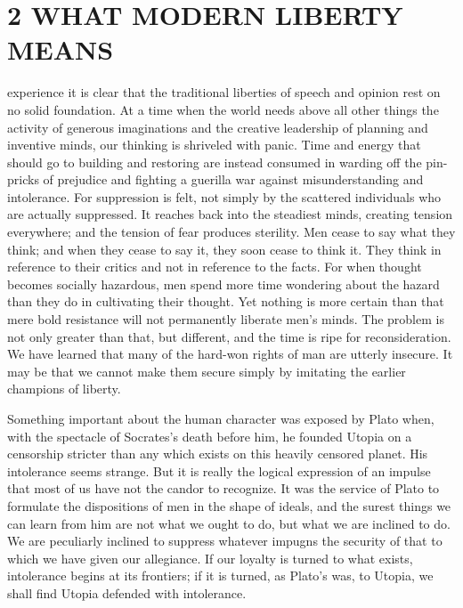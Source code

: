 \documentclass[openany,nobib,twoside,nohyper]{tufte-book}
\let\oldchapter\chapter
\def\chapter{%
  \setcounter{footnote}{0}%
  \oldchapter
}
\begin{document}
\newpage
\thispagestyle{plain} %
\mbox{}

\chapter[2 \hspace*{1mm} WHAT MODERN LIBERTY MEANS]{2 WHAT MODERN LIBERTY MEANS}
\label{ch:MODERN-LIBERTY}

 experience it is clear that the traditional liberties of
speech and opinion rest on no solid foundation. At a time when the world
needs above all other things the activity of generous imaginations and
the creative leadership of planning and inventive minds, our thinking is
shriveled with panic. Time and energy that should go to building and
restoring are instead consumed in warding off the pin-pricks of
prejudice and fighting a guerilla war against misunderstanding and
intolerance. For suppression is felt, not simply by the scattered
individuals who are actually suppressed. It reaches back into the
steadiest minds, creating tension everywhere; and the tension of fear
produces sterility. Men cease to say what they think; and when they
cease to say it, they soon cease to think it. They think in reference to
their critics and not in reference to the facts. For when thought
becomes socially hazardous, men spend more time wondering about the
hazard than they do in cultivating their thought. Yet nothing is more
certain than that mere bold resistance will not permanently liberate
men's minds. The problem is not only greater than that, but different,
and the time is ripe for reconsideration. We have learned that many of
the hard-won rights of man are utterly insecure. It may be that we
cannot make them secure simply by imitating the earlier champions of
liberty.

\enlargethispage{\baselineskip}

Something important about the human character was exposed by Plato when,
with the spectacle of Socrates's death before him, he founded Utopia on
a censorship stricter than any which exists on this heavily censored
planet. His intolerance seems strange. But it is really the logical
expression of an impulse that most of us have not the candor to
recognize. It was the service of Plato to formulate the dispositions of
men in the shape of ideals, and the surest things we can learn from him
are not what we ought to do, but what we are inclined to do. We are
peculiarly inclined to suppress whatever impugns the security of that to
which we have given our allegiance. If our loyalty is turned to what
exists, intolerance begins at its frontiers; if it is turned, as Plato's
was, to Utopia, we shall find Utopia defended with intolerance.
\end{document}
